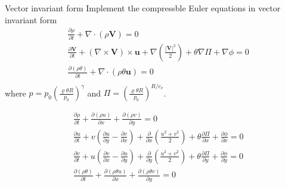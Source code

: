 \documentclass[handout,t,fleqn,leqno,aspectratio=1610,10pt]{beamer}
\begin{document}
\begin{frame}{Vector invariant form}
Implement the compressble Euler equations in vector invariant form
\begin{equation*}
  \begin{aligned}
&\frac{\partial \rho}{\partial t}
+
\nabla \cdot (\rho \mathbf{V})
=0\\
&\frac{\partial \mathbf{V}}{\partial t}
+
(\nabla \times \mathbf{V}) \times \mathbf{u}
+
\nabla\left(\frac{|\mathbf{V}|^2}{2}\right)
+
\theta \nabla \Pi
+
 \nabla \phi
=0\\
&\frac{\partial (\rho\theta)}{\partial t}
+
\nabla \cdot (\rho\theta \mathbf{u})
=0\\
  \end{aligned}
\end{equation*}
where $p = p_0 \left ( \frac{\varrho \theta R}{p_0} \right )^{\gamma}$ and $\Pi = \left (\frac{\varrho \theta R}{p_0} \right )^{R/{c_v}}$.

\begin{equation*}
  \begin{aligned}
&\frac{\partial \rho}{\partial t}
+ \frac{\partial (\rho u)}{\partial x}
+ \frac{\partial (\rho v)}{\partial y}
=0\\
&\frac{\partial u}{\partial t}
+ v\left(\frac{\partial u}{\partial y}-\frac{\partial v}{\partial x}\right)
+ \frac{\partial}{\partial x}\left(\frac{u^2+v^2}{2}\right)
+ \theta \frac{\partial \Pi}{\partial x}
+ \frac{\partial \phi}{\partial x}
=0\\
&\frac{\partial v}{\partial t}
+ u\left(\frac{\partial v}{\partial x}-\frac{\partial u}{\partial y}\right)
+ \frac{\partial}{\partial y}\left(\frac{u^2+v^2}{2}\right)
+ \theta \frac{\partial \Pi}{\partial y}
+ \frac{\partial \phi}{\partial y}
=0\\
&\frac{\partial (\rho\theta)}{\partial t}
+ \frac{\partial (\rho\theta u)}{\partial x}
+ \frac{\partial (\rho\theta v)}{\partial y}
=0
  \end{aligned}
\end{equation*}

\end{frame}
\end{document}
